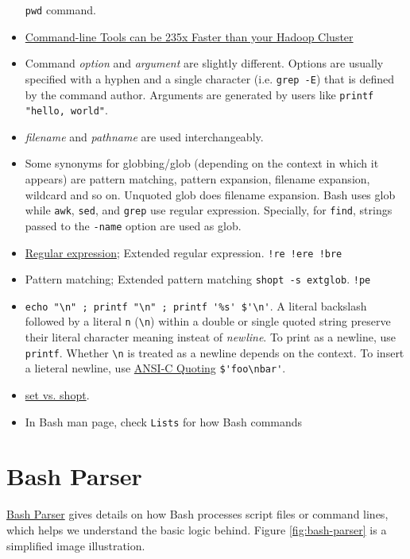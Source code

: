 \begin{itemize}
  \lstinline|pwd| command.
\item
  \href{https://adamdrake.com/command-line-tools-can-be-235x-faster-than-your-hadoop-cluster.html}{Command-line
    Tools can be 235x Faster than your Hadoop Cluster}
\item Command \textit{option} and \textit{argument} are slightly
  different. Options are usually specified with a hyphen and a
  single character (i.e. \lstinline|grep -E|) that is defined by
  the command author. Arguments are generated by users like
  \lstinline|printf "hello, world"|.
\item \textit{filename} and \textit{pathname} are used
  interchangeably.
\item Some synonyms for globbing/glob (depending on the context in
  which it appears) are pattern matching, pattern expansion,
  filename expansion, wildcard and so on. Unquoted glob does
  filename expansion. Bash uses glob while \lstinline|awk|,
  \lstinline|sed|, and \lstinline|grep| use regular
  expression. Specially, for \lstinline|find|, strings passed to
  the \lstinline|-name| option are used as glob.
\item
  \href{https://www.regular-expressions.info/tutorial.html}{Regular
    expression}; Extended regular expression. \verb|!re !ere !bre|
\item Pattern matching; Extended pattern matching
  \lstinline|shopt -s extglob|. \verb|!pe|
\item \lstinline|echo "\n" ; printf "\n" ; printf '%s' $'\n'|. A
  literal backslash followed by a literal \verb|n|
  (\lstinline|\n|) within a double or single quoted string
  preserve their literal character meaning insteat of
  \textit{newline}. To print as a newline, use
  \lstinline|printf|. Whether \verb|\n| is treated as a newline
  depends on the context. To insert a lieteral newline, use
  \href{https://www.gnu.org/software/bash/manual/bash.html#ANSI_002dC-Quoting}{ANSI-C
    Quoting} \lstinline|$'foo\nbar'|.
\item \href{https://unix.stackexchange.com/q/32409}{set
    vs. shopt}.
\item In Bash man page, check \verb|Lists| for how Bash commands 
\end{itemize}

\section{Bash Parser}
\label{sec:bash-parser}

\href{http://mywiki.wooledge.org/BashParser}{Bash Parser} gives details
on how Bash processes script files or command lines, which helps
we understand the basic logic behind. Figure \ref{fig:bash-parser}
is a simplified image illustration.

